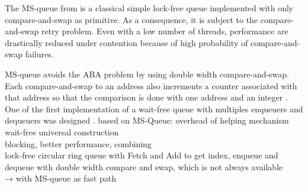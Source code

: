  The MS-queue \cite{Michael96simple} from is a classical simple
lock-free queue implemented with only compare-and-swap as primitive. As a
consequence, it is subject to the compare-and-swap retry problem. Even with a
low number of threads, performance are drastically reduced under contention
because of high probability of compare-and-swap failures.

MS-queue avoids the ABA problem by using double width compare-and-swap. Each
compare-and-swap to an address also increments a counter associated with that
address so that the comparison is done with one address and an integer
\cite{Herlihy08} \cite{Michael96simple}. \\

 One of the first implementation of a wait-free
queue with multiples enqueuers and dequeuers was designed . based on MS-Queue:
overhead of helping mechanism \\

 wait-free universal construction \\

 blocking, better performance, combining \\

 lock-free circular ring queue with Fetch and Add to get index, enqueue and
dequeue with double width compare and swap, which is not always available \\

 → with MS-queue as fast path
